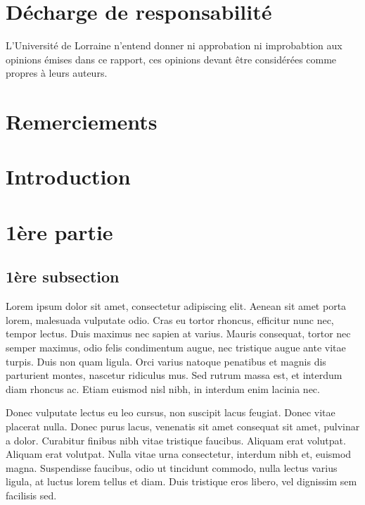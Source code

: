 \documentclass[11pt]{article}
\begin{document}
\newpage \newpage
\section*{Décharge de responsabilité }\bigbreak
L'Université de Lorraine n'entend donner ni approbation  ni improbabtion aux opinions émises dans ce rapport,
ces opinions devant être considérées comme propres à leurs auteurs. \bigbreak

\newpage
\section*{Remerciements}

\newpage
\tableofcontents
\newpage

\setcounter{page}{1}
\section*{Introduction}



\section{1ère partie}
\subsection{1ère subsection}
Lorem ipsum dolor sit amet, consectetur adipiscing elit. Aenean sit amet porta 
lorem, malesuada vulputate odio. Cras eu tortor rhoncus, efficitur nunc nec, 
tempor lectus. Duis maximus nec sapien at varius. Mauris consequat, tortor nec 
semper maximus, odio felis condimentum augue, 
nec tristique augue ante vitae turpis. Duis non quam ligula. Orci varius natoque 
penatibus et magnis dis parturient montes, nascetur ridiculus mus. Sed rutrum 
massa est, et interdum diam rhoncus ac. Etiam euismod nisl nibh, in interdum enim 
lacinia nec. \bigbreak

Donec vulputate lectus eu leo cursus, non suscipit lacus feugiat. Donec vitae 
placerat nulla. Donec purus lacus, venenatis sit amet consequat sit amet, pulvinar
 a dolor. Curabitur finibus nibh vitae tristique faucibus. Aliquam erat volutpat. 
 Aliquam erat volutpat. Nulla vitae urna consectetur, interdum nibh et, euismod 
 magna. Suspendisse faucibus, odio ut tincidunt commodo, nulla lectus varius 
 ligula, at luctus lorem tellus et diam. Duis tristique eros libero, vel 
 dignissim sem facilisis sed. 
\end{document}

